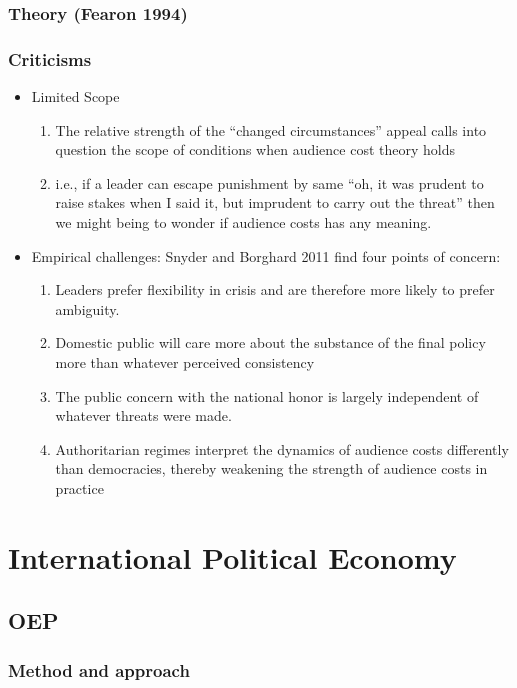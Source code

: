 \documentclass[11pt]{article}
\begin{document}
\subsubsection{Theory (Fearon 1994)}
\label{sec-1-7-1}
\subsubsection{Criticisms}
\label{sec-1-7-2}
\begin{itemize}
\item Limited Scope
\label{sec-1-7-2-1}
\begin{enumerate}
\item The relative strength of the ``changed circumstances'' appeal calls
into question the scope of conditions when audience cost theory holds
\item i.e., if a leader can escape punishment by same ``oh, it was prudent
to raise stakes when I said it, but imprudent to carry out the
threat'' then we might being to wonder if audience costs has any
meaning.
\end{enumerate}
\item Empirical challenges:
\label{sec-1-7-2-2}
Snyder and Borghard 2011 find four points of concern: 

\begin{enumerate}
\item Leaders prefer flexibility in crisis and are therefore more likely
to prefer ambiguity.
\item Domestic public will care more about the substance of the final
policy more than whatever perceived consistency
\item The public concern with the national honor is largely independent
of whatever threats were made.
\item Authoritarian regimes interpret the dynamics of audience costs
differently than democracies, thereby weakening the strength of
audience costs in practice
\end{enumerate}
\end{itemize}

\section{International Political Economy}
\label{sec-2}
\subsection{OEP}
\label{sec-2-1}
\subsubsection{Method and approach}
\label{sec-2-1-1}
\end{document}
